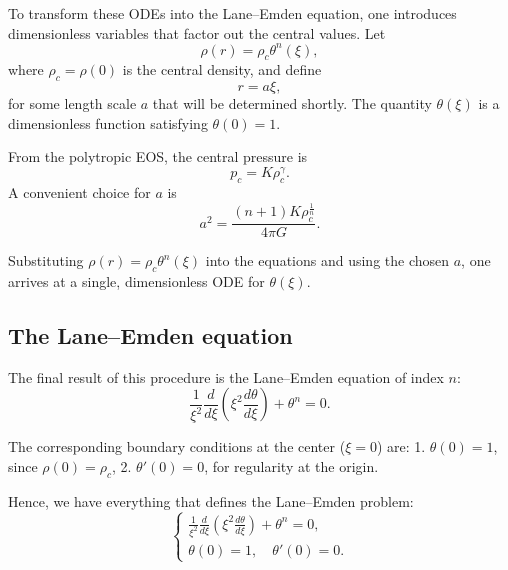 \documentclass{article}
\begin{document}
To transform these ODEs into the Lane–Emden equation, one introduces dimensionless variables that factor out the central values. Let
\[
\rho(r) = \rho_c \theta^n(\xi),
\]
where \(\rho_c = \rho(0)\) is the central density, and define
\[
r = a \xi,
\]
for some length scale \(a\) that will be determined shortly. The quantity \(\theta(\xi)\) is a dimensionless function satisfying \(\theta(0) = 1\).  

From the polytropic EOS, the central pressure is
\[
p_c = K \rho_c^\gamma.
\]
A convenient choice for \(a\) is
\[
a^2 = \frac{(n+1) K \rho_c^{\tfrac{1}{n}}}{4\pi G}.
\]

Substituting \(\rho(r) = \rho_c \theta^n(\xi)\) into the equations and using the chosen \(a\), one arrives at a single, dimensionless ODE for \(\theta(\xi)\).

\subsection{The Lane–Emden equation}

The final result of this procedure is the Lane–Emden equation of index \(n\):
\[
\boxed{
\frac{1}{\xi^2} \frac{d}{d\xi} \left( \xi^2 \frac{d\theta}{d\xi} \right) + \theta^n = 0.
}
\]

The corresponding boundary conditions at the center (\(\xi=0\)) are:
1. \(\theta(0) = 1\), since \(\rho(0) = \rho_c\),
2. \(\theta'(0) = 0\), for regularity at the origin.

Hence, we have everything that defines the Lane–Emden problem:
\[
\begin{cases}
\frac{1}{\xi^2} \frac{d}{d\xi} \left( \xi^2 \frac{d\theta}{d\xi} \right) + \theta^n = 0, \\[6pt]
\theta(0) = 1, \quad \theta'(0) = 0.
\end{cases}
\]
\end{document}
